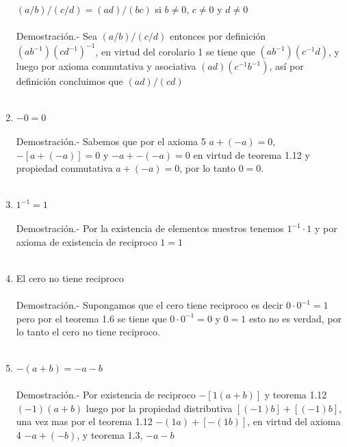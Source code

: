 \begin{enumerate}
\begin{teo}
$(a/b)/(c/d)=(ad)/(bc)$ si $b\neq 0$,  $c\neq 0$ y $d\neq 0$\\\\
Demostración.- \;
Sea $(a/b)/(c/d)$ entonces por definición $(ab^{-1})(cd^{-1})^{-1}$, en virtud del corolario 1 se tiene que $(ab^{-1})(c^{-1}d)$, y luego por axioma conmutativa y asociativa $(ad)(c^{-1}b^{-1})$, así por definición concluimos que $(ad)/(cd)$\\\\
\end{teo}

\item $-0=0$\\\\
Demostración.- \;
Sabemos que por el axioma 5 $a+(-a)=0$, $- \left[ a+(-a) \right] = 0$ y $-a+-(-a)=0$ en virtud de teorema 1.12 y propiedad conmutativa $a+(-a)=0$, por lo tanto $0=0$.\\\\ 


\item 
$1^{-1}=1$\\\\
Demostración.- \;
Por la existencia de elementos nuestros tenemos $1^{-1}\cdot 1$ y por axioma de existencia de reciproco $1=1$\\\\

\item El cero no tiene reciproco\\\\
Demostración.- \;
Supongamos que el cero tiene reciproco es decir $0\cdot 0^{-1}=1$ pero por el teorema 1.6 se tiene que $0\cdot 0^{-1}=0$ y $0=1$ esto no es verdad, por lo tanto el cero no tiene reciproco.\\\\

\item $-(a+b)=-a-b$\\\\
Demostración.- \;
Por existencia de reciproco $-\left[1(a+b)\right]$ y teorema 1.12 $(-1)(a+b)$ luego por la propiedad distributiva $\left[ (-1)b \right] + \left[ (-1)b \right]$, una vez mas por el teorema 1.12 $-(1a)+ \left[-(1b)\right]$, en virtud del axioma 4 $-a+(-b)$, y teorema 1.3, $-a-b$ \\\\ 


\end{enumerate}
